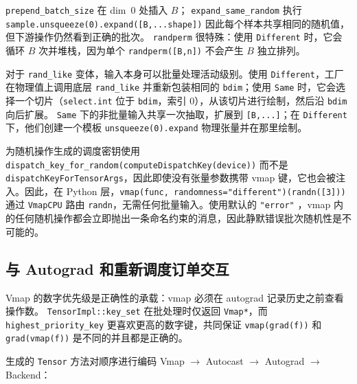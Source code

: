 \texttt{prepend\_batch\_size} 在 dim~0 处插入 $B$； \texttt{expand\_same\_random} 执行 \texttt{sample.unsqueeze(0).expand([B,...shape])} 因此每个样本共享相同的随机值，但下游操作仍然看到正确的批次。 \texttt{randperm} 很特殊：使用 \texttt{Different} 时，它会循环 $B$ 次并堆栈，因为单个 \texttt{randperm([B,n])} 不会产生 $B$ 独立排列。

对于 \texttt{rand\_like} 变体，输入本身可以批量处理活动级别。使用 \texttt{Different}，工厂在物理值上调用底层 \texttt{rand\_like} 并重新包装相同的 \texttt{bdim}；使用 \texttt{Same} 时，它会选择一个切片（\texttt{select.int} 位于 \texttt{bdim}，索引 0），从该切片进行绘制，然后沿 \texttt{bdim} 向后扩展。 \texttt{Same} 下的非批量输入共享一次抽取，扩展到 \texttt{[B,...]}；在 \texttt{Different} 下，他们创建一个模板 \texttt{unsqueeze(0).expand} 物理张量并在那里绘制。

为随机操作生成的调度密钥使用 \texttt{dispatch\_key\_for\_random(computeDispatchKey(device))} 而不是 \texttt{dispatchKeyForTensorArgs}，因此即使没有张量参数携带 vmap 键，它也会被注入。因此，在 Python 层，\texttt{vmap(func, randomness="different")(randn([3]))} 通过 \texttt{VmapCPU} 路由 \texttt{randn}，无需任何批量输入。使用默认的 \texttt{"error"} ，vmap 内的任何随机操作都会立即抛出一条命名约束的消息，因此静默错误批次随机性是不可能的。

\subsection{与 Autograd 和重新调度订单交互}
\label{sec:autogradinteract}

Vmap 的数字优先级是正确性的承载：vmap 必须在 autograd 记录历史之前查看操作数。 \texttt{TensorImpl::key\_set} 在批处理时仅返回 \texttt{Vmap*}，而 \texttt{highest\_priority\_key} 更喜欢更高的数字键，共同保证 \texttt{vmap(grad(f))} 和 \texttt{grad(vmap(f))} 是不同的并且都是正确的。

生成的 \texttt{Tensor} 方法对顺序进行编码 Vmap $\rightarrow$ Autocast $\rightarrow$ Autograd $\rightarrow$ Backend：

